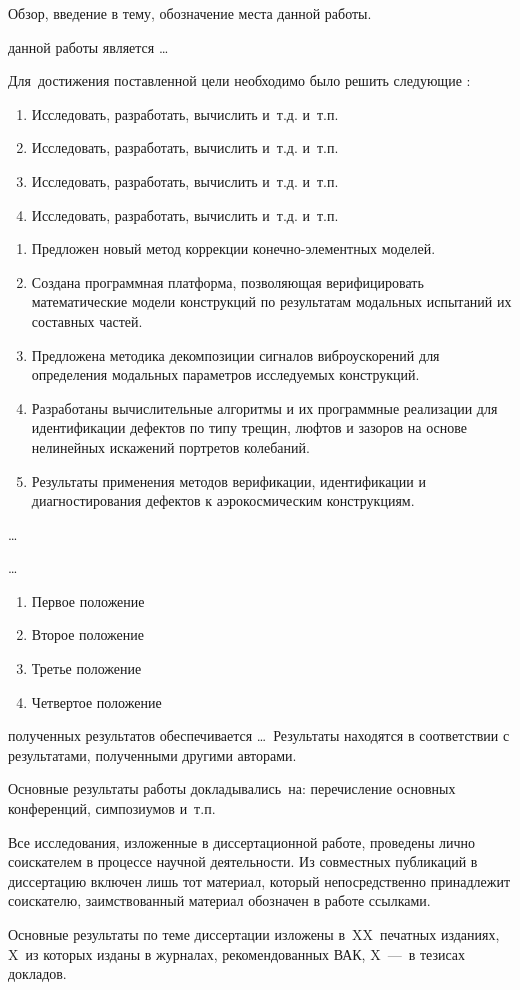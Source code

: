 
{\actuality} Обзор, введение в тему, обозначение места данной работы.

{\aim} данной работы является \ldots

Для~достижения поставленной цели необходимо было решить следующие {\tasks}:
\begin{enumerate}[beginpenalty = 10000] 
	\item Исследовать, разработать, вычислить и~т.\:д. и~т.\:п.
	\item Исследовать, разработать, вычислить и~т.\:д. и~т.\:п.
	\item Исследовать, разработать, вычислить и~т.\:д. и~т.\:п.
	\item Исследовать, разработать, вычислить и~т.\:д. и~т.\:п.
\end{enumerate}

{\novelty}
\begin{enumerate}[beginpenalty = 10000] 
	\item Предложен новый метод коррекции конечно-элементных моделей. 
	\item Создана программная платформа, позволяющая верифицировать математические модели конструкций по результатам модальных испытаний их составных частей.
	\item Предложена методика декомпозиции сигналов виброускорений для определения модальных параметров исследуемых конструкций.
	\item Разработаны вычислительные алгоритмы и их программные реализации для идентификации дефектов по типу трещин, люфтов и зазоров на основе нелинейных искажений портретов колебаний.
	\item Результаты применения методов верификации, идентификации и диагностирования дефектов к аэрокосмическим конструкциям.
\end{enumerate}

{\influence} \ldots

{\methods} \ldots

{}
\begin{enumerate}[beginpenalty = 10000] 
	\item Первое положение
	\item Второе положение
	\item Третье положение
	\item Четвертое положение
\end{enumerate}

{\reliability} полученных результатов обеспечивается \ldots \ Результаты находятся в соответствии с результатами, полученными другими авторами.

{\probation}
Основные результаты работы докладывались~на: перечисление основных конференций, симпозиумов и~т.\:п.

{\contribution} 
Все исследования, изложенные в диссертационной работе, проведены лично соискателем в процессе научной
деятельности. Из совместных публикаций в диссертацию включен лишь тот материал, который непосредственно принадлежит соискателю, заимствованный материал обозначен в работе ссылками.

{\publications} 
Основные результаты по теме диссертации изложены в~XX~печатных изданиях, X~из которых изданы в журналах, рекомендованных ВАК, X~---~в тезисах докладов.
